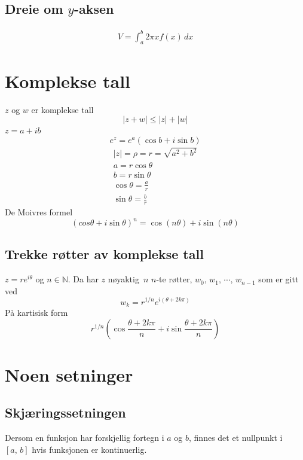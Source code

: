 \documentclass[defaultpackages]{cheatsheet}
\begin{document}
	\subsection{Dreie om $y$-aksen}
	\begin{gather*}
		V = \int_a^b 2\pi xf(x)\,dx
	\end{gather*}
	\section{Komplekse tall}

	$z$ og $w$ er komplekse tall
	\[|z+w|\le |z|+|w|\]
	$z=a+ib$
	\[e^z = e^a(\cos b + i\sin b)\]
	\begin{gather*}
		|z| = \rho = r = \sqrt{a^2+b^2}\\
		a = r\cos\theta\\
		b = r\sin\theta\\
		\cos \theta = \frac{a}{r}\\
		\sin \theta = \frac{b}{r}
	\end{gather*}
	De Moivres formel
	\[(cos \theta + i\sin\theta)^n = \cos(n\theta) + i\sin(n\theta)\]
	\subsection{Trekke røtter av komplekse tall}
	$z=re^{i\theta}$ og $n \in \mathbb{N}$. Da har $z$ nøyaktig $n$ $n$-te røtter, $w_0,\,w_1,\,\cdots,\,w_{n-1}$ som er gitt ved
	\[w_k = r^{1/n}e^{i(\theta + 2k\pi)}\]
	På kartisisk form
	\[r^{1/n} \left(\cos \frac{\theta + 2k\pi}{n} + i \sin \frac{\theta + 2k\pi}{n}\right)\]

	\section{Noen setninger}
	\subsection{Skjæringssetningen}
	Dersom en funksjon har forskjellig fortegn i $a$ og $b$, finnes det et nullpunkt i $[a,\,b]$ hvis funksjonen er kontinuerlig.
\end{document}
